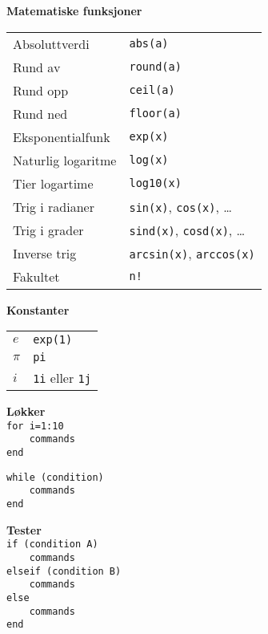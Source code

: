 \documentclass[a4paper, 12pt, notitlepage, english]{article}
\begin{document}
\begin{multicols}{2}
\vspace{1.5cm}
{\large \bf Matematiske funksjoner}
$ $ \\ \begin{tabular}{l l}
Absoluttverdi & \verb!abs(a)! \\ 
Rund av & \verb!round(a)! \\ 
Rund opp & \verb!ceil(a)! \\ 
Rund ned & \verb!floor(a)! \\ 
Eksponentialfunk & \verb!exp(x)! \\ 
Naturlig logaritme & \verb!log(x)! \\ 
Tier logartime & \verb!log10(x)! \\ 
Trig i radianer & \verb!sin(x)!, \verb!cos(x)!, \ldots \\ 
Trig i grader & \verb!sind(x)!, \verb!cosd(x)!, \ldots \\ 
Inverse trig & \verb!arcsin(x)!, \verb!arccos(x)! \\ 
Fakultet & \verb+n!+ \\ 
\end{tabular}

\vspace{0.5cm}

{\large \bf Konstanter}
$ $ \\ 
\begin{tabular}{l l}
$e$ & \verb+exp(1)+ \\[-0.5cm] 
$\pi$ & \verb+pi+ \\[-0.5cm]
$i$ & \verb+1i+ eller \verb+1j+
\end{tabular}

\vspace{0.5cm}

{\large \bf Løkker}
$ $ \\ 
\verb+for i=1:10+ \\
\verb+    commands+ \\
\verb+end+ 

\verb+while (condition)+ \\
\verb+    commands+ \\
\verb+end+ 

\vspace{0.5cm}

{\large \bf Tester}
$ $ \\ 
\verb+if (condition A)+ \\
\verb+    commands+ \\
\verb+elseif (condition B)+ \\
\verb+    commands+ \\
\verb+else+ \\
\verb+    commands+ \\
\verb+end+ 


\end{multicols}
\end{document}
